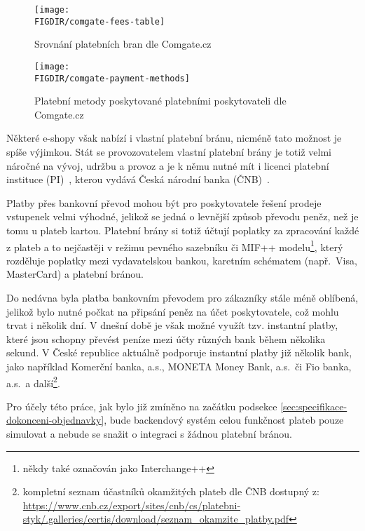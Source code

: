 \begin{figure}[H]
    \texttt{[image: \\FIGDIR/comgate-fees-table]}
    \centering
    \caption{Srovnání platebních bran dle Comgate.cz~\cite{comgate_srovnani_platebnich_bran}}
    \label{fig:comgate-fees-table}
\end{figure}

\begin{figure}[H]
    \texttt{[image: \\FIGDIR/comgate-payment-methods]}
    \centering
    \caption{Platební metody poskytované platebními poskytovateli dle Comgate.cz~\cite{comgate_srovnani_platebnich_bran}}
    \label{fig:comgate-payment-methods}
\end{figure}

Některé e-shopy však nabízí i vlastní platební bránu, nicméně tato možnost je spíše výjimkou.
Stát se provozovatelem vlastní platební brány je totiž velmi náročné na vývoj, udržbu a provoz a je k němu nutné mít i licenci platební instituce (PI)~\cite{schejbal_platebni_instituce}, kterou vydává Česká národní banka (ČNB)~\cite{cnb_dohled_platebni_instituce}.

Platby přes bankovní převod mohou být pro poskytovatele řešení prodeje vstupenek velmi výhodné, jelikož se jedná o levnější způsob převodu peněz, než je tomu u plateb kartou.
Platební brány si totiž účtují poplatky za zpracování každé z plateb a to nejčastěji v režimu pevného sazebníku či MIF++ modelu\footnote{někdy také označován jako Interchange++}, který rozděluje poplatky mezi vydavatelskou bankou, karetním schématem (např.\ Visa, MasterCard) a platební bránou.

Do nedávna byla platba bankovním převodem pro zákazníky stále méně oblíbená, jelikož bylo nutné počkat na připsání peněz na účet poskytovatele, což mohlu trvat i několik dní.
V dnešní době je však možné využít tzv. instantní platby, které jsou schopny převést peníze mezi účty různých bank během několika sekund.
V České republice aktuálně podporuje instantní platby již několik bank, jako například Komerční banka, a.s., MONETA Money Bank, a.s.\ či Fio banka, a.s.\ a další\footnote{kompletní seznam účastníků okamžitých plateb dle ČNB dostupný z: \url{https://www.cnb.cz/export/sites/cnb/cs/platebni-styk/.galleries/certis/download/seznam_okamzite_platby.pdf}}.

Pro účely této práce, jak bylo již zmíněno na začátku podsekce \ref{sec:specifikace-dokonceni-objednavky}, bude backendový systém celou funkčnost plateb pouze simulovat a nebude se snažit o integraci s žádnou platební bránou.


